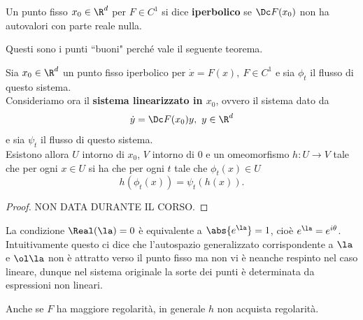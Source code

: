 \begin{definition}
Un punto fisso $x_0\in\R^d$ per $F\in C^1$ si dice \textbf{iperbolico} se $\Dc F(x_0)$ non ha autovalori con parte reale nulla.
\end{definition}

\noindent Questi sono i punti ``buoni" perch\'e vale il seguente teorema.

\begin{theorem}\label{TeoremaHartmanGrobman}
Sia $x_0\in\R^d$ un punto fisso iperbolico per $\dot x=F(x),\ F\in C^1$ e sia $\phi_t$ il flusso di questo sistema.\\
Consideriamo ora il \textbf{sistema linearizzato in $x_0$}, ovvero il sistema dato da
\[\dot y=\Dc F(x_0) y,\ y\in\R^d\]
e sia $\psi_t$ il flusso di questo sistema.\\
Esistono allora $U$ intorno di $x_0$, $V$ intorno di $0$ e un omeomorfismo $h:U\to V$ tale che per ogni $x\in U$ si ha che per ogni $t$ tale che $\phi_t(x)\in U$
\[h(\phi_t(x))=\psi_t(h(x)).\]
\end{theorem}
\begin{proof}
NON DATA DURANTE IL CORSO.
\end{proof}

\begin{remark}
La condizione $\Real(\la)=0$ \`e equivalente a $\abs{e^\la}=1$, cio\`e $e^\la=e^{i\theta}$. Intuitivamente questo ci dice che l'autospazio generalizzato corrispondente a $\la$ e $\ol\la$ non \`e attratto verso il punto fisso ma non vi \`e neanche respinto nel caso lineare, dunque nel sistema originale la sorte dei punti \`e determinata da espressioni non lineari.
\end{remark}

\begin{remark}
Anche se $F$ ha maggiore regolarit\`a, in generale $h$ non acquista regolarit\`a.
\end{remark}

